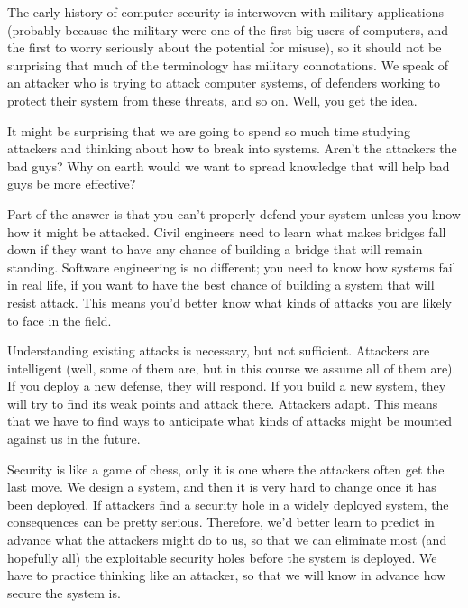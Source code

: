 \documentclass[11pt]{article}
\begin{document}
The early history of computer security is interwoven with military applications
(probably because the military were one of the first big users of
computers, and the first to worry seriously about the potential for
misuse), so it should not be surprising that much of the terminology
has military connotations. We speak of an attacker who is trying to
attack computer systems, of defenders working to protect their system
from these threats, and so on. Well, you get the idea. 

It might be
surprising that we are going to spend so much time studying attackers
and thinking about how to break into systems. Aren't the attackers the
bad guys? Why on earth would we want to spread knowledge that will
help bad guys be more effective? 

Part of the answer is that you can't properly defend your system
unless you know how it might be attacked.  Civil engineers need to learn what makes bridges fall
down if they want to have any chance of building a bridge that will
remain standing. Software engineering is no different; you need to know
how systems fail in real life, if you want to have the best chance of
building a system that will resist attack. This means you'd better
know what kinds of attacks you are likely to face in the field. 

Understanding existing attacks is necessary, but not sufficient. 
Attackers are intelligent (well,
some of them are, but in this course we assume all of them are).  
If you deploy a new defense, they will
respond. If you build a new system, they will try to find its weak
points and attack there. Attackers adapt. This means that we have to
find ways to anticipate what kinds of attacks might be mounted against
us in the future. 

Security is like a game of chess, only it is one
where the attackers often get the last move. We design a system, and
then it is very hard to change once it has been deployed. If attackers
find a security hole in a widely deployed system, the consequences can
be pretty serious. Therefore, we'd better learn to predict in advance
what the attackers might do to us, so that we can eliminate most (and hopefully
all) the exploitable security holes before the system is deployed. We have to practice
thinking like an attacker, so that we will know in advance how secure
the system is. 
\end{document}
